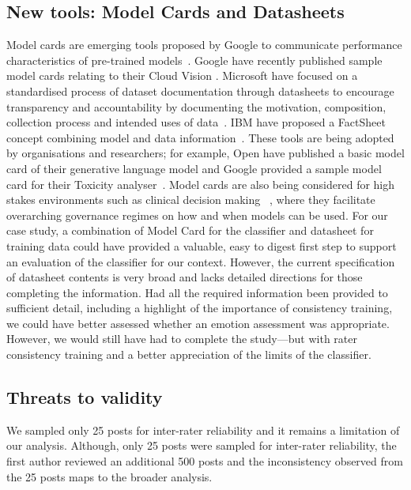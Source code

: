 \subsection{New tools: Model Cards and Datasheets}\label{ase2020-industry:subsec:ModelCards}
Model cards are emerging tools proposed by Google to communicate performance characteristics of pre-trained models~\citep{Mitchell:2018in}.  Google have recently published sample model cards relating to their Cloud Vision .  Microsoft have focused on a standardised process of dataset documentation through datasheets to encourage transparency and accountability by documenting the motivation, composition, collection process and intended uses of data~\citep{Gebru:2018wh}.  IBM have proposed a FactSheet concept combining model and data information~\citep{Arnold2019FactSheets:Conformity}.  These tools are being adopted by organisations and researchers;  for example, Open  have published a basic model card of their generative language model and Google provided a sample model card for their Toxicity analyser~\citep{Mitchell:2018in}.  Model cards are also being considered for high stakes environments such as clinical decision making~ \citep{Sendak2020PresentingLabels}, where they facilitate overarching governance regimes on how and when models can be used.
For our case study, a combination of Model Card for the classifier and datasheet for training data could have provided a valuable, easy to digest first step to support an evaluation of the classifier for our context.  However, the current specification of datasheet contents is very broad and lacks detailed directions for those completing the information.  Had all the required information been provided to sufficient detail, including a highlight of the importance of consistency training, we could have better assessed whether an emotion assessment was appropriate.  However, we would still have had to complete the study---but with rater consistency training and a better appreciation of the limits of the classifier. 

\subsection{Threats to validity} 
 We sampled only 25 posts for inter-rater reliability and it remains a limitation of our analysis.  Although, only 25 posts were sampled for inter-rater reliability, the first author reviewed an additional 500 posts and the inconsistency observed from the 25 posts maps to the broader analysis.

